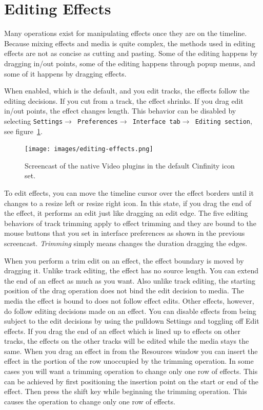 \section{Editing Effects}%
\label{sec:editing_effects}

Many operations exist for manipulating effects once they are on the timeline. Because mixing effects and media is quite complex, the methods used in editing effects are not as concise as cutting and pasting. Some of the editing happens by dragging in/out points, some of the editing happens through popup menus, and some of it happens by dragging effects.

When enabled, which is the default, and you edit tracks, the effects follow the editing decisions. If you cut from a track, the effect shrinks. If you drag edit in/out points, the effect changes length. This behavior can be disabled by selecting \texttt{Settings$\rightarrow$ Preferences$\rightarrow$ Interface tab$\rightarrow$ Editing section}, see figure~\ref{fig:editing-effects}.

\begin{figure}[htpb]
    \centering
    \texttt{[image: images/editing-effects.png]}
    \caption{Screencast of the native Video plugins in the default Cinfinity icon set.}
    \label{fig:editing-effects}
\end{figure}

To edit effects, you can move the timeline cursor over the effect borders until it changes to a resize left or resize right icon. In this state, if you drag the end of the effect, it performs an edit just like dragging an edit edge. The five editing behaviors of track trimming apply to effect trimming and they are bound to the mouse buttons that you set in interface preferences as shown in the previous screencast. \textit{Trimming} simply means changes the duration dragging the edges.

When you perform a trim edit on an effect, the effect boundary is moved by dragging it. Unlike track editing, the effect has no source length. You can extend the end of an effect as much as you want. Also unlike track editing, the starting position of the drag operation does not bind the edit decision to media. The media the effect is bound to does not follow effect edits. Other effects, however, do follow editing decisions made on an effect. You can disable effects from being subject to the edit decisions by using the pulldown Settings and toggling off Edit effects. If you drag the end of an effect which is lined up to effects on other tracks, the effects on the other tracks will be edited while the media stays the same. When you drag an effect in from the Resources window you can insert the effect in the portion of the row unoccupied by the trimming operation. In some cases you will want a trimming operation to change only one row of effects. This can be achieved by first positioning the insertion point on the start or end of the effect. Then press the shift key while beginning the trimming operation. This causes the operation to change only one row of effects.

